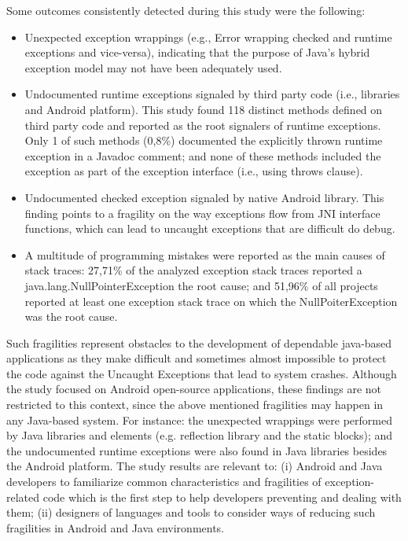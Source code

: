 \documentclass[conference]{IEEEtran}
\begin{document}

Some outcomes consistently detected during this study were the following:

\begin{itemize}


   \item  Unexpected exception wrappings (e.g., Error wrapping checked and runtime
    exceptions and vice-versa), indicating that the purpose of Java's hybrid exception model may not have been adequately used.

   \item Undocumented runtime exceptions signaled by third party  code (i.e., libraries and Android platform). 
This study found 118 distinct methods defined on third party code and  reported as the root signalers of 
runtime exceptions. Only 1 of such methods (0,8\%) documented the explicitly thrown runtime exception 
in a Javadoc comment; and none of these methods included the exception as part of the exception 
interface (i.e., using throws clause).

   \item Undocumented checked exception signaled by native Android library. This finding points to a fragility 
on the way exceptions flow from JNI interface functions, which can lead to uncaught exceptions that are difficult do 
debug.  

  \item  A multitude of programming mistakes were reported as the main causes of stack traces:
 27,71\% of the analyzed exception stack traces reported a java.lang.NullPointerException the root cause;
and  51,96\% of all projects reported at least one exception stack trace on which the NullPoiterException
was the root cause.

\end{itemize}

Such fragilities represent obstacles to the development of dependable java-based applications as they make difficult and 
sometimes almost impossible to protect the code against the Uncaught Exceptions that lead to system crashes.
Although the study focused on Android open-source applications, these findings are not restricted to this context, since 
the above mentioned fragilities may happen in any Java-based system. 
For instance: the unexpected wrappings were performed by Java libraries and elements (e.g. reflection library and 
the static blocks); and the undocumented runtime exceptions were also found in Java libraries besides the Android platform.
The study results are relevant to: (i) Android and Java developers to familiarize common characteristics and fragilities of exception-related code 
which is the first step to help developers preventing and dealing with them; (ii) designers of languages and tools to consider ways of reducing 
such fragilities in Android and Java environments.
\end{document}
